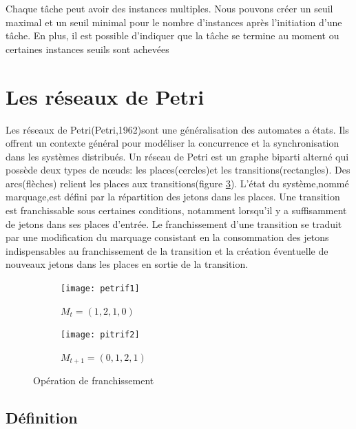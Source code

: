 Chaque tâche peut avoir des instances multiples. Nous pouvons créer un seuil maximal et un seuil minimal pour le nombre d'instances après l'initiation d'une tâche. En plus, il est possible d'indiquer que la tâche se termine au moment ou certaines instances seuils sont achevées

\section{Les réseaux de Petri}

Les réseaux de Petri(Petri,1962)sont une généralisation des automates a états. Ils offrent un contexte général pour modéliser la concurrence et la synchronisation dans les systèmes distribués. Un réseau de Petri est un graphe biparti alterné qui possède deux types de nœuds: les places(cercles)et les transitions(rectangles). Des arcs(flèches) relient les places aux transitions(figure \ref{fig:2 rdp}). L'état du système,nommé marquage,est défini par la répartition des jetons dans les places. Une transition est franchissable sous certaines conditions, notamment lorsqu'il y a suffisamment de jetons dans ses places d’entrée. Le franchissement d’une transition se traduit par une modification du marquage consistant en la consommation des jetons indispensables au franchissement de la transition et la création éventuelle de nouveaux jetons dans les places en sortie de la transition.
\begin{figure}[h]
	\centering
	
	\begin{subfigure}[b]{0.3\textwidth}
		\centering
		\texttt{[image: petrif1]}
		\caption{$M_{t}=(1,2,1,0)$}
		\label{fig:three sin x}
	\end{subfigure}
	\hfill
	\begin{subfigure}[b]{0.3\textwidth}
		\centering
		\texttt{[image: pitrif2]}
		\caption{$M_{t+1}=(0,1,2,1)$}
		\label{fig:five over x}
	\end{subfigure}
	
	\caption{Opération de franchissement}
	\label{fig:2 rdp}
\end{figure}

\subsection{Définition}

